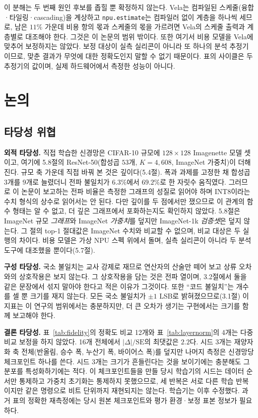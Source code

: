 \documentclass[11pt,a4paper,oneside]{report}
\begin{document}
이 분해는 두 번째 원인 후보를 좁힐 뿐 확정하지 않는다. Vela는 컴파일된 스케줄(융합·타일링·cascading)을
계상하고 \texttt{npu.estimate}는 컴파일러 없이 계층을 하나씩 세므로, 남은 $11\%$ 가운데 비용 항의 몫과
스케줄의 몫을 가르려면 Vela의 스케줄 출력과 계층별로 대조해야 한다. 그것은 이 논문의 범위 밖이다. 또한 여기서 비용 모델을 Vela에 맞추어 보정하지는 않았다. 보정 대상이 실측
실리콘이 아니라 또 하나의 분석 추정기이므로, 맞춘 결과가 무엇에 대한 정확도인지 말할 수 없기 때문이다.
표의 사이클은 두 추정기의 값이며, 실제 하드웨어에서 측정한 성능이 아니다.

\chapter{논의}

\section{타당성 위협}

\textbf{외적 타당성.} 직접 학습한 신경망은 CIFAR-10 규모에 $128\times128$ Imagenette 모델 셋이고, 여기에
5.8절의 ResNet-50(합성곱 $53$개, $K = 4{,}608$, ImageNet 가중치)이 더해진다. 규모 축 가운데 직접 바꿔 본
것은 깊이다(5.4절). 폭과 과제를 고정한 채 합성곱 3개를 9개로 늘렸더니 전파 불일치가 $6.3\%$에서
$69.2\%$로 한 자릿수 움직였다. 그러므로 이 논문이 보고하는 전파 비율은 측정한 그래프의 성질로 읽어야
하며 INT8이라는 수치 형식의 상수로 읽어서는 안 된다. 다만 깊이를 두 점에서만 쟀으므로 이 관계의 함수
형태는 알 수 없고, 더 깊은 그래프에서 포화하는지도 확인하지 않았다. 5.8절은 ImageNet 규모 \emph{그래프}와
ImageNet \emph{가중치}를 덮지만 ImageNet-1k \emph{검증셋}은 덮지 않는다. 그 절의 top-1 절대값은 ImageNet
수치와 비교할 수 없으며, 비교 대상은 두 실행의 차이다.
비용 모델은 가상 NPU 스펙 위에서 돌며, 실측 실리콘이 아니라 두 분석 도구에 대조했을 뿐이다(5.7절).

\textbf{구성 타당성.} 국소 불일치는 교사 강제로 재므로 연산자의 산술만 떼어 보고 상류 오차와의 상호작용은
보지 않는다. 그 상호작용을 담는 것은 전파 열이며, 3.2절에서 둘을 같은 문장에서 섞지 말아야 한다고 적은
이유가 그것이다. 또한 ``코드 불일치''는 개수를 셀 뿐 크기를 재지 않는다. 모든 국소 불일치가 $\pm 1$ LSB로
밝혀졌으므로(3.1절) 이 지표는 이 연구의 범위에서는 충분하지만, 더 큰 오차가 생기는 구현에서는 크기를 함께
보고해야 한다.

\textbf{결론 타당성.} 표~\ref{tab:fidelity}의 정확도 비교 12개와 표~\ref{tab:layernorm}의 4개는 다중비교
보정을 하지 않았다. 16개 전체에서 $|\Delta|/\mathrm{SE}$의 최댓값은 $2.2$다. 시드 3개는 재양자화 축
전체(반올림, 승수 폭, 누산기 폭, 바이어스 폭)를 덮지만 나머지 측정은 신경망당 체크포인트 하나를 쓴다.
시드 3개는 크기가 흔들린다는 것을 보이기에는 충분해도 그 분포를 특성화하기에는 적다. 이 체크포인트들을 만들
당시 학습기의 시드는 데이터 순서만 통제하고 가중치 초기화는 통제하지 못했으므로, 세 반복은 서로 다른
학습 반복이지만 같은 명령으로 비트 단위까지 재현되지는 않는다. 학습기는 이후 수정했다.
과거 표의 정확한 재측정에는 당시 원본 체크포인트와 평가 환경·보정 표본 정보가 필요하다.
\end{document}
